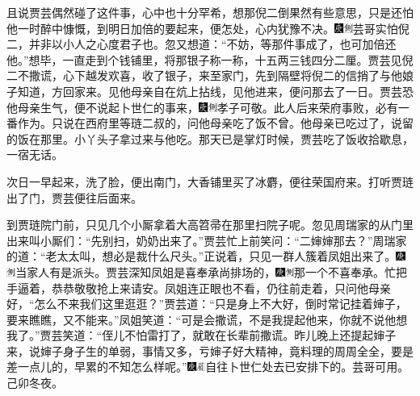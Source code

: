 且说贾芸偶然碰了这件事，心中也十分罕希，想那倪二倒果然有些意思，只是还怕他一时醉中慷慨，到明日加倍的要起来，便怎处，心内犹豫不决。{\includegraphics[width=3mm]{../Images/00004}\includegraphics[width=3mm]{../Images/00011}\footnotesize \kaishu 芸哥实怕倪二，并非以小人之心度君子也。}忽又想道：``不妨，等那件事成了，也可加倍还他。''想毕，一直走到个钱铺里，将那银子称一称，十五两三钱四分二厘。贾芸见倪二不撒谎，心下越发欢喜，收了银子，来至家门，先到隔壁将倪二的信捎了与他娘子知道，方回家来。见他母亲自在炕上拈线，见他进来，便问那去了一日。贾芸恐他母亲生气，便不说起卜世仁的事来，{\includegraphics[width=3mm]{../Images/00004}\includegraphics[width=3mm]{../Images/00011}\footnotesize \kaishu 孝子可敬。此人后来荣府事败，必有一番作为。}只说在西府里等琏二叔的，问他母亲吃了饭不曾。他母亲已吃过了，说留的饭在那里。小丫头子拿过来与他吃。那天已是掌灯时候，贾芸吃了饭收拾歇息，一宿无话。

次日一早起来，洗了脸，便出南门，大香铺里买了冰麝，便往荣国府来。打听贾琏出了门，贾芸便往后面来。

到贾琏院门前，只见几个小厮拿着大高笤帚在那里扫院子呢。忽见周瑞家的从门里出来叫小厮们：``先别扫，奶奶出来了。''贾芸忙上前笑问：``二婶婶那去？''周瑞家的道：``老太太叫，想必是裁什么尺头。''正说着，只见一群人簇着凤姐出来了。{\includegraphics[width=3mm]{../Images/00004}\includegraphics[width=3mm]{../Images/00011}\footnotesize \kaishu 当家人有是派头。}贾芸深知凤姐是喜奉承尚排场的，{\includegraphics[width=3mm]{../Images/00004}\includegraphics[width=3mm]{../Images/00011}\footnotesize \kaishu 那一个不喜奉承。}忙把手逼着，恭恭敬敬抢上来请安。凤姐连正眼也不看，仍往前走着，只问他母亲好，``怎么不来我们这里逛逛？''贾芸道：``只是身上不大好，倒时常记挂着婶子，要来瞧瞧，又不能来。''凤姐笑道：``可是会撒谎，不是我提起他来，你就不说他想我了。''贾芸笑道：``侄儿不怕雷打了，就敢在长辈前撒谎。昨儿晚上还提起婶子来，说婶子身子生的单弱，事情又多，亏婶子好大精神，竟料理的周周全全，要是差一点儿的，早累的不知怎么样呢。''{\includegraphics[width=3mm]{../Images/00004}\includegraphics[width=3mm]{../Images/00010}\footnotesize \kaishu 自往卜世仁处去已安排下的。芸哥可用。己卯冬夜。}


